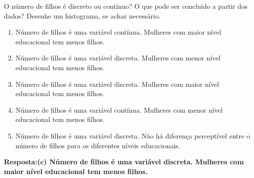 \documentclass[12pt]{article}\documentclass[brazilian,12pt,a4paper,final]{article}
\begin{document}
\begin{enumerate}
 O número de filhos é discreto ou contínuo? O que pode ser concluido a partir dos dados? Desenhe um histograma, se achar necessário.
\begin{enumerate}[label=(\alph*)]
\item Número de filhos é uma variável contínua. Mulheres com maior nível educacional tem menos filhos.
\item Número de filhos é uma variável discreta. Mulheres com menor nível educacional tem menos filhos.
\item Número de filhos é uma variável discreta. Mulheres com maior nível educacional tem menos filhos.
\item Número de filhos é uma variável contínua. Mulheres com menor nível educacional tem menos filhos.
\item Número de filhos é uma variável discreta. Não há diferença perceptível entre o número de filhos para os diferentes níveis educacionais.

\end{enumerate}


\textbf{Resposta:(c) Número de filhos é uma variável discreta. Mulheres com maior nível educacional tem menos filhos.}


\end{enumerate}
\end{document}
